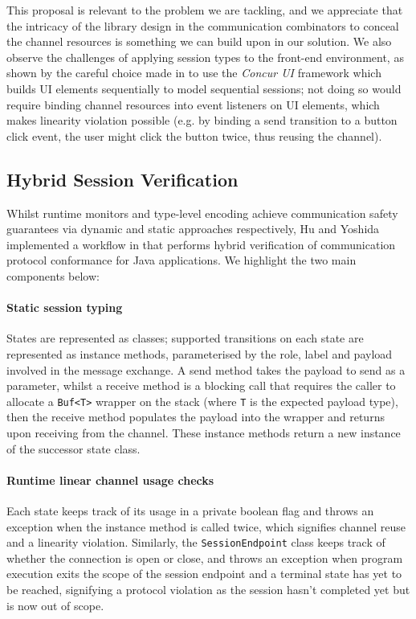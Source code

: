 This proposal is relevant to the problem we are tackling, and we appreciate that the intricacy of the library design in the communication combinators to conceal the channel resources is something we can build upon in our solution. We also observe the challenges of applying session types to the front-end environment, as shown by the careful choice made in \cite{PureScript2019} to use the \textit{Concur UI} framework which builds UI elements sequentially to model sequential sessions; not doing so would require binding channel resources into event listeners on UI elements, which makes linearity violation possible (e.g. by binding a send transition to a button click event, the user might click the button twice, thus reusing the channel).

\subsection{Hybrid Session Verification}
Whilst runtime monitors and type-level encoding achieve communication safety guarantees via dynamic and static approaches respectively, Hu and Yoshida implemented a workflow in \cite{Hybrid2016} that performs hybrid verification of communication protocol conformance for Java applications. We highlight the two main components below:

\paragraph{Static session typing} States are represented as classes; supported transitions on each state are represented as instance methods, parameterised by the role, label and payload involved in the message exchange. A send method takes the payload to send as a parameter, whilst a receive method is a blocking call that requires the caller to allocate a \texttt{Buf<T>} wrapper on the stack (where \texttt{T} is the expected payload type), then the receive method populates the payload into the wrapper and returns upon receiving from the channel. These instance methods return a new instance of the successor state class.

\paragraph{Runtime linear channel usage checks} Each state keeps track of its usage in a private boolean flag and throws an exception when the instance method is called twice, which signifies channel reuse and a linearity violation. Similarly, the \texttt{SessionEndpoint} class keeps track of whether the connection is open or close, and throws an exception when program execution exits the scope of the session endpoint and a terminal state has yet to be reached, signifying a protocol violation as the session hasn't completed yet but is now out of scope.

